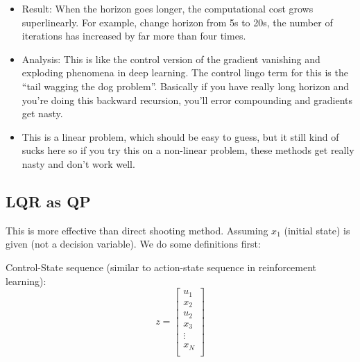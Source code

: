 \begin{itemize}
\begin{equation}
        x_{k+1}=\left[ \begin{matrix}
            1&		h\\
            0&		1\\
        \end{matrix} \right] \left[ \begin{array}{c}
            q_k\\
            \dot{q}_k\\
        \end{array} \right] +\left[ \begin{array}{c}
            \frac{1}{2}h^2\\
            h\\
        \end{array} \right] u_k
    \end{equation}
    \item Result: When the horizon goes longer, the computational cost grows superlinearly. For example, change horizon from 5s to 20s, the number of iterations has increased by far more than four times.
    \item Analysis: This is like the control version of the gradient vanishing and exploding phenomena in deep learning. The control lingo term for this is the ``tail wagging the dog problem''. Basically if you have really long horizon and you're doing this backward recursion, you'll error compounding and gradients get nasty.
    \item This is a linear problem, which should be easy to guess, but it still kind of sucks here so if you try this on a non-linear problem, these methods get really nasty and don't work well.
\end{itemize}

\subsection{LQR as QP}

This is more effective than direct shooting method. Assuming $x_1$ (initial state) is given (not a decision variable). We do some definitions first:

Control-State sequence (similar to action-state sequence in reinforcement learning):
\begin{equation}
    z=\left[ \begin{array}{c}
        u_1\\
        x_2\\
        u_2\\
        x_3\\
        \vdots\\
        x_N\\
    \end{array} \right] 
\end{equation}


